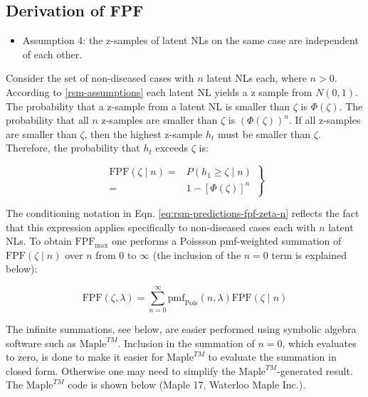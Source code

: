 \documentclass[
]{book}
\providecommand{\tightlist}{%
  \setlength{\itemsep}{0pt}\setlength{\parskip}{0pt}}
\begin{document}
\hypertarget{rsm-predictions-roc-curve-fpf}{%
\subsection{Derivation of FPF}\label{rsm-predictions-roc-curve-fpf}}

\begin{itemize}
\tightlist
\item
  Assumption 4: the z-samples of latent NLs on the same case are independent of each other.
\end{itemize}

Consider the set of non-diseased cases with \(n\) latent NLs each, where \(n > 0\). According to \ref{rsm-assumptions} each latent NL yields a z sample from \(N(0,1)\). The probability that a z-sample from a latent NL is smaller than \(\zeta\) is \(\Phi(\zeta)\). The probability that all \(n\) z-samples are smaller than \(\zeta\) is \((\Phi(\zeta))^n\). If all z-samples are smaller than \(\zeta\), then the highest z-sample \(h_t\) must be smaller than \(\zeta\). Therefore, the probability that \(h_t\) exceeds \(\zeta\) is:

\begin{equation}
\left. 
\begin{aligned}
\text{FPF}\left (\zeta \mid n \right ) =& P\left ( h_1 \geq  \zeta \mid n\right ) \\
=& 1 - \left [ \Phi\left ( \zeta \right )  \right ]^n
\end{aligned}
\right \}
\label{eq:rsm-predictions-fpf-zeta-n}
\end{equation}

The conditioning notation in Eqn. \eqref{eq:rsm-predictions-fpf-zeta-n} reflects the fact that this expression applies specifically to non-diseased cases each with \(n\) latent NLs. To obtain \(\text{FPF}_{\text{max}}\) one performs a Poissson pmf-weighted summation of \(\text{FPF}\left (\zeta \mid n \right )\) over \(n\) from 0 to \(\infty\) (the inclusion of the \(n = 0\) term is explained below):

\begin{equation}
\text{FPF}\left (\zeta, \lambda \right ) = \sum_{n=0}^{\infty} \text{pmf}_{\text{Pois}} \left ( n, \lambda \right )\text{FPF}\left (\zeta \mid n \right )
\label{eq:rsm-predictions-fpf-zeta-before-maple}
\end{equation}

The infinite summations, see below, are easier performed using symbolic algebra software such as \(\text{Maple}^{TM}\). Inclusion in the summation of \(n = 0\), which evaluates to zero, is done to make it easier for \(\text{Maple}^{TM}\) to evaluate the summation in closed form. Otherwise one may need to simplify the \(\text{Maple}^{TM}\)-generated result. The \(\text{Maple}^{TM}\) code is shown below (Maple 17, Waterloo Maple Inc.).
\end{document}
